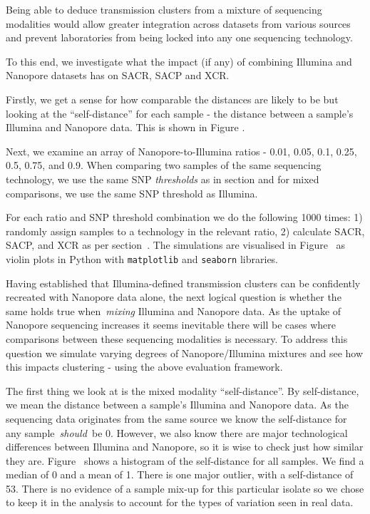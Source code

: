 Being able to deduce transmission clusters from a mixture of sequencing
modalities would allow greater integration across datasets from various
sources and prevent laboratories from being locked into any one
sequencing technology.

To this end, we investigate what the impact (if any) of combining
Illumina and Nanopore datasets has on SACR, SACP and XCR.

Firstly, we get a sense for how comparable the distances are likely to
be but looking at the ``self-distance'' for each sample - the distance
between a sample's Illumina and Nanopore data. This is shown in Figure
.

Next, we examine an array of Nanopore-to-Illumina ratios - 0.01, 0.05,
0.1, 0.25, 0.5, 0.75, and 0.9. When comparing two samples of the same
sequencing technology, we use the same SNP \emph{thresholds} as in
section  and for mixed comparisons, we
use the same SNP threshold as Illumina.

For each ratio and SNP threshold combination we do the following 1000
times: 1) randomly assign samples to a technology in the relevant ratio,
2) calculate SACR, SACP, and XCR as per
section~. The simulations are visualised
in Figure~ as violin plots in Python with
\texttt{matplotlib} and \texttt{seaborn} libraries.

Having established that Illumina-defined transmission clusters can be
confidently recreated with Nanopore data alone, the next logical
question is whether the same holds true when~\emph{mixing} Illumina and
Nanopore data. As the uptake of Nanopore sequencing increases it seems
inevitable there will be cases where comparisons between these
sequencing modalities is necessary. To address this question we simulate
varying degrees of Nanopore/Illumina mixtures and see how this impacts
clustering - using the above evaluation framework.

The first thing we look at is the mixed modality ``self-distance''. By
self-distance, we mean the distance between a sample's Illumina and
Nanopore data. As the sequencing data originates from the same source we
know the self-distance for any sample~\emph{should~}be 0. However, we
also know there are major technological differences between Illumina and
Nanopore, so it is wise to check just how similar they are.
Figure~ shows a histogram of the
self-distance for all samples. We find a median of 0 and a mean of 1.
There is one major outlier, with a self-distance of 53. There is no
evidence of a sample mix-up for this particular isolate so we chose to
keep it in the analysis to account for the types of variation seen in
real data.

